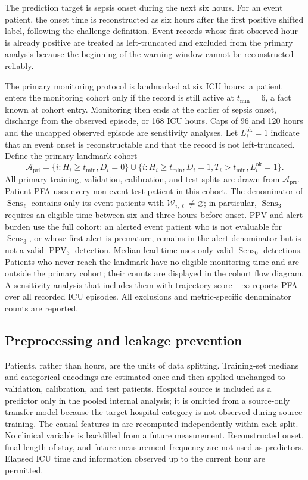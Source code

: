 \documentclass[11pt]{article}
\newcommand{\calW}{\mathcal{W}}
\newcommand{\Sens}{\operatorname{Sens}}
\begin{document}
The prediction target is sepsis onset during the next six hours. For an event patient, the onset time is reconstructed as six hours after the first positive shifted label, following the challenge definition. Event records whose first observed hour is already positive are treated as left-truncated and excluded from the primary analysis because the beginning of the warning window cannot be reconstructed reliably.

The primary monitoring protocol is landmarked at six ICU hours: a patient enters the monitoring cohort only if the record is still active at $t_{\min}=6$, a fact known at cohort entry. Monitoring then ends at the earlier of sepsis onset, discharge from the observed episode, or 168 ICU hours. Caps of 96 and 120 hours and the uncapped observed episode are sensitivity analyses. Let $L_i^{\mathrm{ok}}=1$ indicate that an event onset is reconstructable and that the record is not left-truncated. Define the primary landmark cohort
\begin{equation}
\mathcal A_{\mathrm{pri}}=
\{i:H_i\ge t_{\min},D_i=0\}
\cup
\{i:H_i\ge t_{\min},D_i=1,T_i>t_{\min},L_i^{\mathrm{ok}}=1\}.
\label{eq:primary-cohort}
\end{equation}
All primary training, validation, calibration, and test splits are drawn from $\mathcal A_{\mathrm{pri}}$. Patient PFA uses every non-event test patient in this cohort. The denominator of $\Sens_{\ell}$ contains only its event patients with $\calW_{i,\ell}\ne\varnothing$; in particular, $\Sens_3$ requires an eligible time between six and three hours before onset. PPV and alert burden use the full cohort: an alerted event patient who is not evaluable for $\Sens_3$, or whose first alert is premature, remains in the alert denominator but is not a valid $\operatorname{PPV}_3$ detection. Median lead time uses only valid $\Sens_0$ detections. Patients who never reach the landmark have no eligible monitoring time and are outside the primary cohort; their counts are displayed in the cohort flow diagram. A sensitivity analysis that includes them with trajectory score $-\infty$ reports PFA over all recorded ICU episodes. All exclusions and metric-specific denominator counts are reported.

\subsection{Preprocessing and leakage prevention}

Patients, rather than hours, are the units of data splitting. Training-set medians and categorical encodings are estimated once and then applied unchanged to validation, calibration, and test patients. Hospital source is included as a predictor only in the pooled internal analysis; it is omitted from a source-only transfer model because the target-hospital category is not observed during source training. The causal features in  are recomputed independently within each split. No clinical variable is backfilled from a future measurement. Reconstructed onset, final length of stay, and future measurement frequency are not used as predictors. Elapsed ICU time and information observed up to the current hour are permitted.
\end{document}
